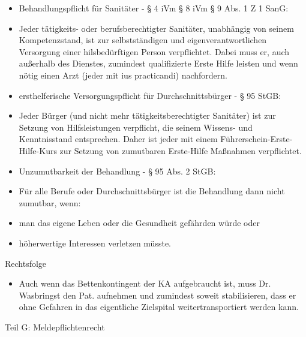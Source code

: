 \documentclass{article}
\begin{document}
\begin{itemize}
\item Behandlungspflicht f\"ur Sanit\"ater - {\S} 4 iVm {\S} 8 iVm {\S}
9 Abs. 1 Z 1 SanG:

\end{itemize}
\begin{itemize}
\item Jeder t\"atigkeits- oder berufsberechtigter Sanit\"ater,
unabh\"angig von seinem Kompetenzstand, ist zur selbstst\"andigen und
eigenverantwortlichen Versorgung einer hilsbed\"urftigen Person
verpflichtet. Dabei muss er, auch au{\ss}erhalb des Dienstes, zumindest
qualifizierte Erste Hilfe leisten und wenn n\"otig einen Arzt (jeder
mit ius practicandi) nachfordern.

\end{itemize}
\begin{itemize}
\item ersthelferische Versorgungspflicht f\"ur Durchschnittsb\"urger -
{\S} 95 StGB:

\end{itemize}
\begin{itemize}
\item Jeder B\"urger (und nicht mehr t\"atigkeitsberechtigter
Sanit\"ater) ist zur Setzung von Hilfsleistungen verpflicht, die seinem
Wissens- und Kenntnisstand entsprechen. Daher ist jeder mit einem
F\"uhrerschein-Erste-Hilfe-Kurs zur Setzung von zumutbaren Erste-Hilfe
Ma{\ss}nahmen verpflichtet.

\end{itemize}
\begin{itemize}
\item Unzumutbarkeit der Behandlung - {\S} 95 Abs. 2 StGB:

\end{itemize}
\begin{itemize}
\item F\"ur alle Berufe oder Durchschnittsb\"urger ist die Behandlung
dann nicht zumutbar, wenn:

\end{itemize}
\begin{itemize}
\item man das eigene Leben oder die Gesundheit gef\"ahrden w\"urde oder

\item h\"oherwertige Interessen verletzen m\"usste.

\end{itemize}
Rechtsfolge

\begin{itemize}
\item Auch wenn das Bettenkontingent der KA aufgebraucht ist, muss Dr.
Wasbringst den Pat. aufnehmen und zumindest soweit stabilisieren, dass
er ohne Gefahren in das eigentliche Zielspital weitertransportiert
werden kann.

\end{itemize}
Teil G: Meldepflichtenrecht
\end{document}
